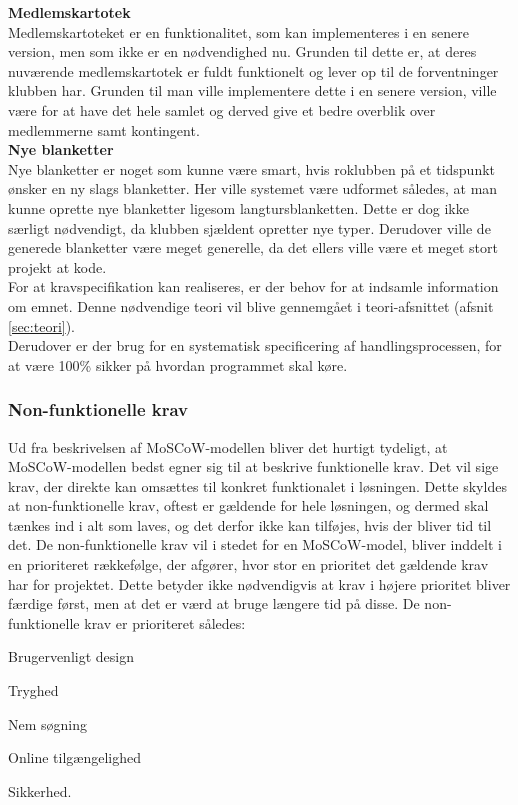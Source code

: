 \textbf{Medlemskartotek}\\
Medlemskartoteket er en funktionalitet, som kan implementeres i en senere version, men som ikke er en nødvendighed nu. Grunden til dette er, at deres nuværende medlemskartotek er fuldt funktionelt og lever op til de forventninger klubben har.
Grunden til man ville implementere dette i en senere version, ville være for at have det hele samlet og derved give et bedre overblik over medlemmerne samt kontingent.\\

\textbf{Nye blanketter}\\
Nye blanketter er noget som kunne være smart, hvis roklubben på et tidspunkt ønsker en ny slags blanketter. Her ville systemet være udformet således, at man kunne oprette nye blanketter ligesom langtursblanketten. Dette er dog ikke særligt nødvendigt, da klubben sjældent opretter nye typer. Derudover ville de generede blanketter være meget generelle, da det ellers ville være et meget stort projekt at kode.\\

For at kravspecifikation kan realiseres, er der behov for at indsamle information om emnet. Denne nødvendige teori vil blive gennemgået i teori-afsnittet (afsnit \ref{sec:teori}). \\
Derudover er der brug for en systematisk specificering af handlingsprocessen, for at være 100\% sikker på hvordan programmet skal køre. 

\subsubsection{Non-funktionelle krav}
Ud fra beskrivelsen af MoSCoW-modellen bliver det hurtigt tydeligt, at MoSCoW-modellen bedst egner sig til at beskrive funktionelle krav. Det vil sige krav, der direkte kan omsættes til konkret funktionalet i løsningen. Dette skyldes at non-funktionelle krav, oftest er gældende for hele løsningen, og dermed skal tænkes ind i alt som laves, og det derfor ikke kan tilføjes, hvis der bliver tid til det. De non-funktionelle krav vil i stedet for en MoSCoW-model, bliver inddelt i en prioriteret rækkefølge, der afgører, hvor stor en prioritet det gældende krav har for projektet. Dette betyder ikke nødvendigvis at krav i højere prioritet bliver færdige først, men at det er værd at bruge længere tid på disse. De non-funktionelle krav er prioriteret således:

\begin{enumerate_small}
    \item Brugervenligt design
    \item Tryghed
    \item Nem søgning
    \item Online tilgængelighed
    \item Sikkerhed.
\end{enumerate_small}

